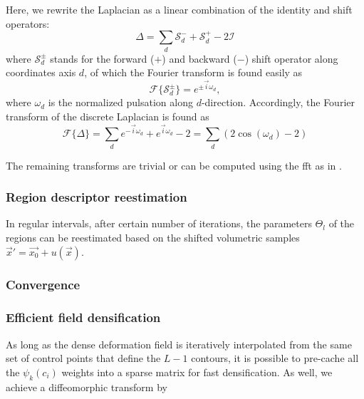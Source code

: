 Here, we rewrite the Laplacian as a linear combination of the identity and shift operators:
\begin{equation}
\Delta = \sum\limits_d \mathcal{S}_d^- + \mathcal{S}_d^+ - 2 \mathcal{I}
\end{equation}
where $\mathcal{S}_{d}^{\pm}$ stands for the forward ($+$) and backward ($-$) shift
operator along coordinates axis $d$, of which the Fourier transform is found easily as
\begin{equation}
\mathcal{F}\{\mathcal{S}_{d}^{\pm}\} = e^{\pm \vec{i}\omega_{d}},
\end{equation}
where $\omega_{d}$ is the normalized pulsation along $d$-direction. Accordingly, the
Fourier transform of the discrete Laplacian is found as
\begin{equation}
\mathcal{F}\{\Delta\} = \sum\limits_d e^{-\vec{i}\omega_d } + e^{\vec{i}\omega_d } - 2 = \sum\limits_d \left( 2\cos(\omega_d) - 2 \right)
\end{equation}

The remaining transforms are trivial or can be computed using the \gls{fft}
as in \citep{estellers_efficient_2011}.

\subsubsection{Region descriptor reestimation}
In regular intervals, after certain number of iterations,
the parameters $\Theta_l$ of the regions can be reestimated
based on the shifted volumetric samples
$\vec{x}' = \vec{x_0} + u(\vec{x})$.

\subsubsection{Convergence}

\subsubsection{Efficient field densification}
As long as the dense deformation field is iteratively interpolated
from the same set of control points that define the $L-1$ contours,
it is possible to pre-cache all the $\psi_k(c_i)$ weights into a
sparse matrix for fast densification. As well, we achieve a
diffeomorphic transform by
